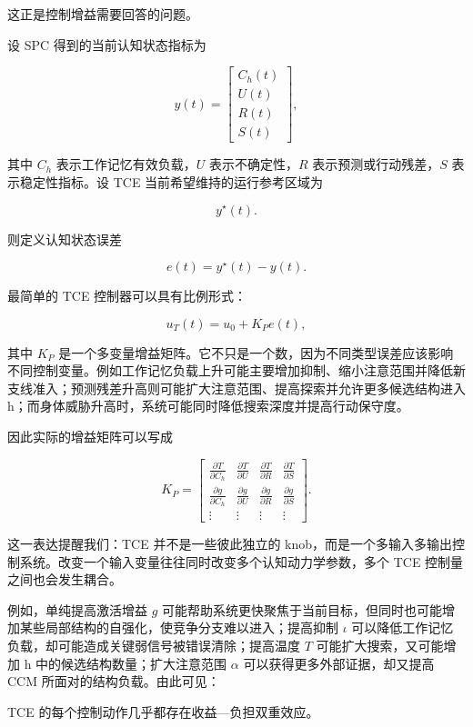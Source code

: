 这正是控制增益需要回答的问题。

设 SPC 得到的当前认知状态指标为

\[
y(t)
=
\begin{bmatrix}
C_h(t)\\
U(t)\\
R(t)\\
S(t)
\end{bmatrix},
\]

其中 $C_h$ 表示工作记忆有效负载，$U$ 表示不确定性，$R$ 表示预测或行动残差，$S$ 表示稳定性指标。设 TCE 当前希望维持的运行参考区域为

\[
y^\star(t).
\]

则定义认知状态误差

\[
e(t)=y^\star(t)-y(t).
\]

最简单的 TCE 控制器可以具有比例形式：

\[
u_T(t)
=
u_0
+
K_P e(t),
\]

其中 $K_P$ 是一个多变量增益矩阵。它不只是一个数，因为不同类型误差应该影响不同控制变量。例如工作记忆负载上升可能主要增加抑制、缩小注意范围并降低新支线准入；预测残差升高则可能扩大注意范围、提高探索并允许更多候选结构进入 h；而身体威胁升高时，系统可能同时降低搜索深度并提高行动保守度。

因此实际的增益矩阵可以写成

\[
K_P=
\begin{bmatrix}
\frac{\partial T}{\partial C_h} &
\frac{\partial T}{\partial U} &
\frac{\partial T}{\partial R} &
\frac{\partial T}{\partial S}
\\
\frac{\partial g}{\partial C_h} &
\frac{\partial g}{\partial U} &
\frac{\partial g}{\partial R} &
\frac{\partial g}{\partial S}
\\
\vdots & \vdots & \vdots & \vdots
\end{bmatrix}.
\]

这一表达提醒我们：TCE 并不是一些彼此独立的 knob，而是一个多输入多输出控制系统。改变一个输入变量往往同时改变多个认知动力学参数，多个 TCE 控制量之间也会发生耦合。

例如，单纯提高激活增益 $g$ 可能帮助系统更快聚焦于当前目标，但同时也可能增加某些局部结构的自强化，使竞争分支难以进入；提高抑制 $\iota$ 可以降低工作记忆负载，却可能造成关键弱信号被错误清除；提高温度 $T$ 可能扩大搜索，又可能增加 h 中的候选结构数量；扩大注意范围 $\alpha$ 可以获得更多外部证据，却又提高 CCM 所面对的结构负载。由此可见：

\begin{remark}
TCE 的每个控制动作几乎都存在收益—负担双重效应。
\end{remark}

